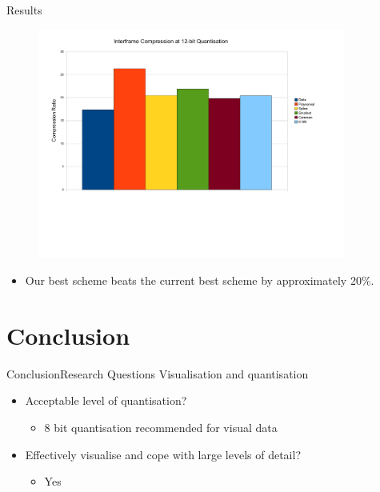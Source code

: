 \documentclass{beamer}
\begin{document}
\begin{frame}{Results}
\begin{figure}[h]
\centering \includegraphics[trim = 10mm 60mm 10mm 5mm, clip,
  width=0.9\textwidth]{julian-images/interframe_results.pdf}
\end{figure}
\begin{itemize}
\item Our best scheme beats the current best scheme by approximately 20\%.
\end{itemize}
\end{frame}


\section{Conclusion}
\begin{frame}{Conclusion}{Research Questions}
Visualisation and quantisation
\begin{itemize}
 \item Acceptable level of quantisation?
 \begin{itemize}
  \item 8 bit quantisation recommended for visual data
 \end{itemize}
 \item Effectively visualise and cope with large levels of detail?
 \begin{itemize}
  \item Yes
 \end{itemize}
\end{itemize}
\end{frame}
\end{document}
